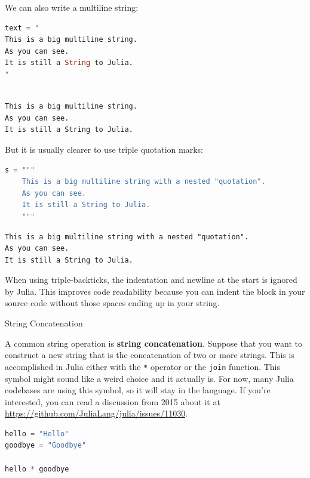 \documentclass[
  notoc %
]{tufte-book}
\makeatletter
\newcommand{\passthrough}[1]{#1}
\renewcommand\subsubsection{%
\@startsection{subsubsection}{3}{\z@ }{-3.25ex\@plus -1ex \@minus -.2ex}{1.5ex \@plus .2ex}{\normalfont \normalsize \bfseries }
}
\makeatother
\begin{document}
We can also write a multiline string:

\begin{lstlisting}[language=Julia]
text = "
This is a big multiline string.
As you can see.
It is still a String to Julia.
"
\end{lstlisting}

\begin{lstlisting}[language=Output]

This is a big multiline string.
As you can see.
It is still a String to Julia.

\end{lstlisting}

But it is usually clearer to use triple quotation marks:

\begin{lstlisting}[language=Julia]
s = """
    This is a big multiline string with a nested "quotation".
    As you can see.
    It is still a String to Julia.
    """
\end{lstlisting}

\begin{lstlisting}[language=Output]
This is a big multiline string with a nested "quotation".
As you can see.
It is still a String to Julia.

\end{lstlisting}

When using triple-backticks, the indentation and newline at the start is
ignored by Julia. This improves code readability because you can indent
the block in your source code without those spaces ending up in your
string.

\hypertarget{sec:string_concatenation}{%
\subsubsection{String Concatenation}\label{sec:string_concatenation}}

A common string operation is \textbf{string concatenation}. Suppose that
you want to construct a new string that is the concatenation of two or
more strings. This is accomplished in Julia either with the
\passthrough{\lstinline!*!} operator or the
\passthrough{\lstinline!join!} function. This symbol might sound like a
weird choice and it actually is. For now, many Julia codebases are using
this symbol, so it will stay in the language. If you're interested, you
can read a discussion from 2015 about it at
\url{https://github.com/JuliaLang/julia/issues/11030}.

\begin{lstlisting}[language=Julia]
hello = "Hello"
goodbye = "Goodbye"

hello * goodbye
\end{lstlisting}
\end{document}
